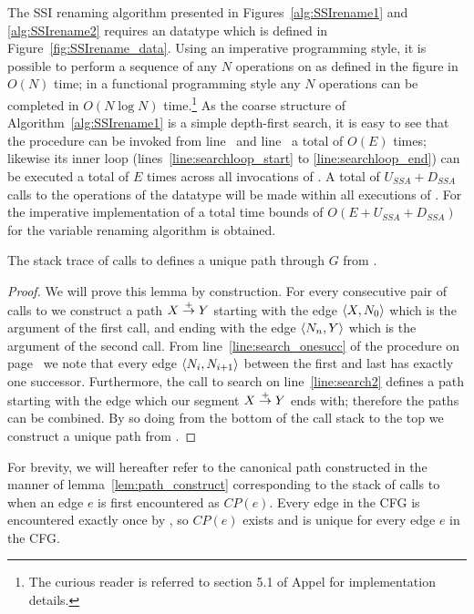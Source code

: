 The SSI renaming algorithm presented in Figures~\ref{alg:SSIrename1}
and \ref{alg:SSIrename2} requires
an  datatype which is defined in
Figure~\ref{fig:SSIrename_data}.  Using an imperative programming
style, it is possible to perform a sequence of any $N$ operations on
 as defined in the figure in $O(N)$ time; in a
functional programming style any $N$ operations can be completed in
$O(N \log N)$ time.\footnote{The curious reader is referred to section
5.1 of Appel \cite{appel:modern} for implementation details.}  As the
coarse structure of Algorithm~\ref{alg:SSIrename1} is a simple
depth-first search, it is easy to see that the  procedure
can be invoked from line~ and
line~ a total of $O(E)$ times; likewise its
inner loop (lines~\ref{line:searchloop_start} to
\ref{line:searchloop_end}) can be executed a total of $E$ times across
all invocations of .  A total of $U_{SSA}+D_{SSA}$ calls
to the operations of the  datatype will be made
within all executions of .  For the imperative
implementation of  a total time bounds of
$O(E+U_{SSA}+D_{SSA})$ for the variable renaming algorithm is
obtained.

\begin{lemma}\label{lem:path_construct}
The stack trace of calls to  defines a unique path
through $G$ from .
\end{lemma}
\begin{proof}
We will prove this lemma by construction.  For every consecutive pair
of calls to  we construct a path $X\stackrel{+}{\rightarrow} Y$ starting with the
edge $\left\langle X,N_0 \right\rangle$ which is the argument of the first call, and
ending with the edge $\left\langle N_n, Y \right\rangle$ which is the argument of the
second call.  From line~\ref{line:search_onesucc} of the 
procedure on page~\pageref{line:search_onesucc} we note that every
edge $\left\langle N_i, N_{i+1} \right\rangle$ between the first and last has exactly one
successor.  Furthermore, the call to search on line~\ref{line:search2}
defines a path starting with the edge which our segment $X\stackrel{+}{\rightarrow} Y$
ends with; therefore the paths can be combined.  By so doing from the
bottom of the call stack to the top we construct a unique path from
.
\end{proof}

For brevity, we will hereafter refer to the canonical path constructed
in the manner of lemma~\ref{lem:path_construct} corresponding to the
stack of calls to  when an edge $e$ is first
encountered as $CP(e)$.  Every edge in the CFG is encountered exactly
once by , so $CP(e)$ exists and is unique for every edge
$e$ in the CFG.


